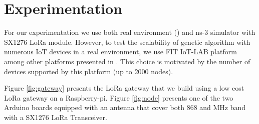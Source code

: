 \section{Experimentation} \label{sec:Experimentation}

For our experimentation we use both real environment () and ns-3 simulator with SX1276 LoRa module.
However,
	to test the scalability of genetic algorithm with numerous IoT devices in a real environment,
	we use FIT IoT-LAB platform among other platforms presented in \cite{tonneau_how_2015}.
This choice is motivated by the number of devices supported by this platform (up to 2000 nodes).

Figure \ref{fig:gateway} presents the LoRa gateway that we build using a low cost LoRa gateway \cite{lowcostloragateway} on a Raspberry-pi.
Figure \ref{fig:node} presents one of the two Arduino boards equipped with an antenna that cover both 868 and  MHz band with a SX1276 LoRa Transceiver.


